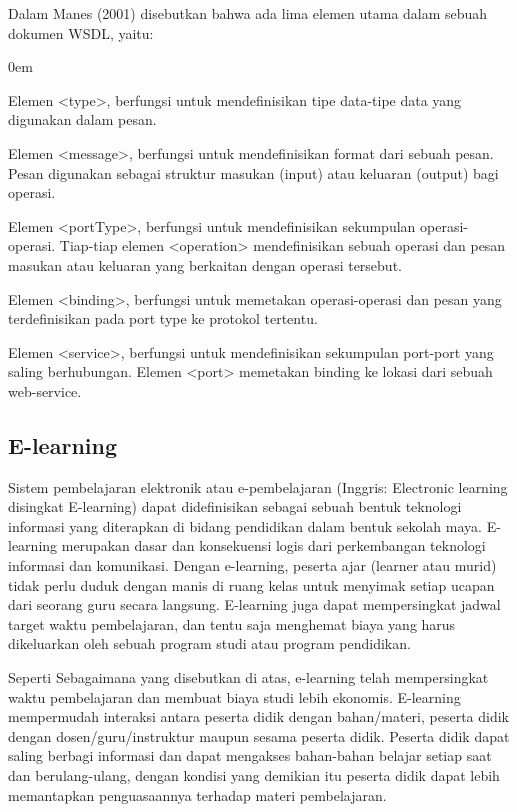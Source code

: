 \documentclass{jtetiproposalskripsi}
\begin{document}
Dalam Manes (2001) disebutkan bahwa ada lima elemen utama dalam sebuah dokumen WSDL, yaitu:
\vspace{-0.5cm}
\begin{enumerate}[a.]
\begin{singlespace}
\itemsep0em
\item Elemen <type>, berfungsi untuk mendefinisikan tipe data-tipe data yang digunakan dalam pesan.
\item Elemen  <message>,  berfungsi  untuk  mendefinisikan  format  dari  sebuah  pesan.  Pesan  digunakan   sebagai  struktur masukan (input) atau keluaran (output) bagi operasi.
\item Elemen  <portType>,  berfungsi  untuk  mendefinisikan  sekumpulan  operasi-operasi.  Tiap-tiap  elemen  <operation> mendefinisikan sebuah operasi dan pesan masukan atau keluaran yang berkaitan dengan operasi tersebut.
\item Elemen  <binding>,  berfungsi  untuk  memetakan  operasi-operasi  dan  pesan  yang  terdefinisikan  pada  port  type  ke protokol tertentu.
\item Elemen <service>, berfungsi untuk mendefinisikan sekumpulan port-port yang saling berhubungan.   Elemen <port> memetakan binding ke lokasi dari sebuah web-service.
\end{singlespace}
\end{enumerate}

\subsection{E-learning}
Sistem pembelajaran elektronik atau e-pembelajaran (Inggris: Electronic learning disingkat E-learning) dapat didefinisikan sebagai sebuah bentuk teknologi informasi yang diterapkan di bidang pendidikan dalam bentuk sekolah maya. E-learning merupakan dasar dan konsekuensi logis dari perkembangan teknologi informasi dan komunikasi. Dengan e-learning, peserta ajar (learner atau murid) tidak perlu duduk dengan manis di ruang kelas untuk menyimak setiap ucapan dari seorang guru secara langsung. E-learning juga dapat mempersingkat jadwal target waktu pembelajaran, dan tentu saja menghemat biaya yang harus dikeluarkan oleh sebuah program studi atau program pendidikan.

Seperti Sebagaimana yang disebutkan di atas, e-learning telah mempersingkat waktu pembelajaran dan membuat biaya studi lebih ekonomis. E-learning mempermudah interaksi antara peserta didik dengan bahan/materi, peserta didik dengan dosen/guru/instruktur maupun sesama peserta didik. Peserta didik dapat saling berbagi informasi dan dapat mengakses bahan-bahan belajar setiap saat dan berulang-ulang, dengan kondisi yang demikian itu peserta didik dapat lebih memantapkan penguasaannya terhadap materi pembelajaran.
\end{document}
